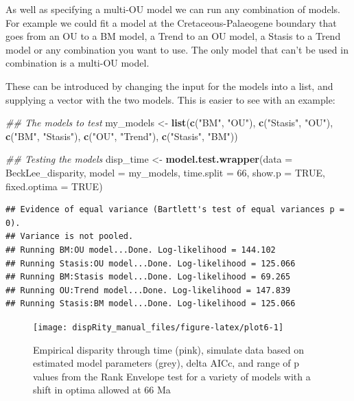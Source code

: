 \documentclass[]{book}
\newenvironment{Shaded}{\begin{snugshade}}{\end{snugshade}}
\newcommand{\CommentTok}[1]{\textcolor[rgb]{0.56,0.35,0.01}{\textit{#1}}}
\newcommand{\DataTypeTok}[1]{\textcolor[rgb]{0.13,0.29,0.53}{#1}}
\newcommand{\DecValTok}[1]{\textcolor[rgb]{0.00,0.00,0.81}{#1}}
\newcommand{\KeywordTok}[1]{\textcolor[rgb]{0.13,0.29,0.53}{\textbf{#1}}}
\newcommand{\NormalTok}[1]{#1}
\newcommand{\OtherTok}[1]{\textcolor[rgb]{0.56,0.35,0.01}{#1}}
\newcommand{\StringTok}[1]{\textcolor[rgb]{0.31,0.60,0.02}{#1}}
\begin{document}
As well as specifying a multi-OU model we can run any combination of models.
For example we could fit a model at the Cretaceous-Palaeogene boundary that goes from an OU to a BM model, a Trend to an OU model, a Stasis to a Trend model or any combination you want to use.
The only model that can't be used in combination is a multi-OU model.

These can be introduced by changing the input for the models into a list, and supplying a vector with the two models.
This is easier to see with an example:

\begin{Shaded}
\begin{Highlighting}[]
\CommentTok{## The models to test}
\NormalTok{my_models <-}\StringTok{ }\KeywordTok{list}\NormalTok{(}\KeywordTok{c}\NormalTok{(}\StringTok{"BM"}\NormalTok{, }\StringTok{"OU"}\NormalTok{),}
                  \KeywordTok{c}\NormalTok{(}\StringTok{"Stasis"}\NormalTok{, }\StringTok{"OU"}\NormalTok{),}
                  \KeywordTok{c}\NormalTok{(}\StringTok{"BM"}\NormalTok{, }\StringTok{"Stasis"}\NormalTok{),}
                  \KeywordTok{c}\NormalTok{(}\StringTok{"OU"}\NormalTok{, }\StringTok{"Trend"}\NormalTok{),}
                  \KeywordTok{c}\NormalTok{(}\StringTok{"Stasis"}\NormalTok{, }\StringTok{"BM"}\NormalTok{))}

\CommentTok{## Testing the models}
\NormalTok{disp_time <-}\StringTok{ }\KeywordTok{model.test.wrapper}\NormalTok{(}\DataTypeTok{data =}\NormalTok{ BeckLee_disparity,}
                                \DataTypeTok{model =}\NormalTok{ my_models, }\DataTypeTok{time.split =} \DecValTok{66}\NormalTok{,}
                                \DataTypeTok{show.p =} \OtherTok{TRUE}\NormalTok{, }\DataTypeTok{fixed.optima =} \OtherTok{TRUE}\NormalTok{)}
\end{Highlighting}
\end{Shaded}

\begin{verbatim}
## Evidence of equal variance (Bartlett's test of equal variances p = 0).
## Variance is not pooled.
## Running BM:OU model...Done. Log-likelihood = 144.102
## Running Stasis:OU model...Done. Log-likelihood = 125.066
## Running BM:Stasis model...Done. Log-likelihood = 69.265
## Running OU:Trend model...Done. Log-likelihood = 147.839
## Running Stasis:BM model...Done. Log-likelihood = 125.066
\end{verbatim}

\begin{figure}

{\centering \texttt{[image: dispRity\_manual\_files/figure-latex/plot6-1]} 

}

\caption{Empirical disparity through time (pink), simulate data based on estimated model parameters (grey), delta AICc, and range of p values from the Rank Envelope test for a variety of models with a shift in optima allowed at 66 Ma}\label{fig:plot6}
\end{figure}
\end{document}
